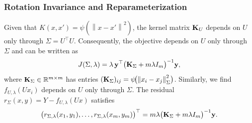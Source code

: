 \documentclass[sn-mathphys-num]{sn-jnl}%
\numberwithin{equation}{section}
\newcommand{\R}{\mathbb{R}}
\newcommand{\kernel}{K}
\newcommand{\norm}[1]{\left\|{#1}\right\|} %
\theoremstyle{thmstyleone}%
\theoremstyle{thmstyletwo}%
\theoremstyle{thmstylethree}%
\begin{document}
\subsubsection{Rotation Invariance and Reparameterization} 
Given that $\kernel(x,x')=\psi(\norm{x-x'}^2)$, the kernel matrix $\mathbf{K}_U$ depends 
on $U$ only through $\Sigma = U^\top U$. Consequently, the objective depends on $U$ only through 
$\Sigma$ and can be written as
\begin{equation}	
\label{eqn:J-formula-finite-atoms}
	J(\Sigma, \lambda) =
	\lambda\,
	\mathbf{y}^\top
	\bigl(\mathbf{K}_\Sigma + m\lambda I_m\bigr)^{-1}
	\mathbf{y},
\end{equation}
where $\K_\Sigma  \in \R^{m\times m}$ has entries $(\K_\Sigma)_{ij} = \psi\!\bigl(\norm{x_i-x_j}_\Sigma^2\bigr)$. 
Similarly, we find $f_{U, \lambda}(Ux_i)$ depends on $U$ only through $\Sigma$. The residual 
$r_\Sigma(x, y) = Y - f_{U, \lambda}(Ux)$ satisfies 
\begin{equation}
\label{eqn:r-sigma-finite-m}
	\bigl(
		r_{\Sigma,\lambda}(x_1, y_1),
		\ldots,
		r_{\Sigma,\lambda}(x_m, y_m)
	\bigr)^\top
	= m \lambda
	\bigl(\mathbf{K}_\Sigma + m\lambda I_m\bigr)^{-1}
	\mathbf{y} .
\end{equation}
\end{document}
